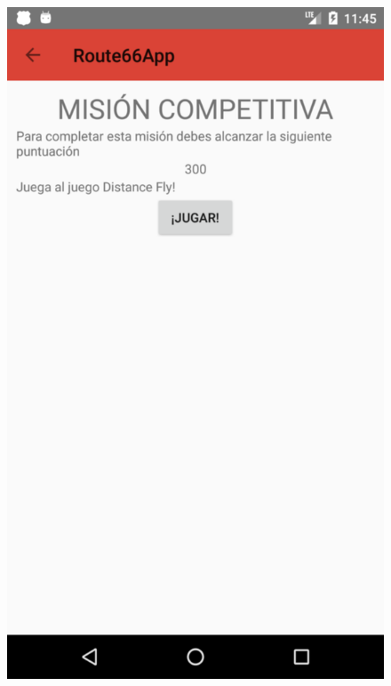 \documentclass[twoside]{report}
\begin{document}
\begin{figure}[H]
\begin{center}
\includegraphics[scale=0.25]{images/userguide/28.png}

\end{center}
\end{figure}
\end{document}
